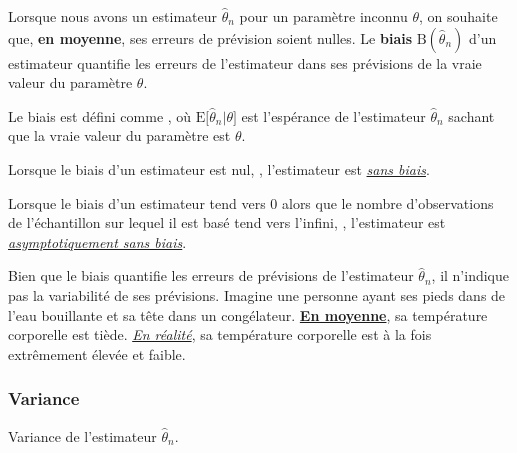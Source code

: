 \documentclass[10pt, french]{article}
\begin{document}
\begin{multicols*}{2}
\begin{rappel_enhanced}[Motivation]
Lorsque nous avons un estimateur $\hat{\theta}_{n}$ pour un paramètre inconnu $\theta$, on souhaite que, \textbf{en moyenne}, ses erreurs de prévision soient nulles. Le \textbf{biais} $\text{B}(\hat{\theta}_{n})$ d'un estimateur quantifie les erreurs de l'estimateur dans ses prévisions de la vraie valeur du paramètre $\theta$.
\end{rappel_enhanced}


\begin{definitionNOHFILL}
Le biais est défini comme , où $\text{E}\lbrack\hat{\theta}_{n} | \theta\rbrack$ est l'espérance de l'estimateur $\hat{\theta}_{n}$ sachant que la vraie valeur du paramètre est $\theta$.

\begin{definitionNOHFILLprop}
Lorsque le biais d'un estimateur est nul, , l'estimateur est \underline{\textit{sans biais}}.
\end{definitionNOHFILLprop}

\begin{definitionNOHFILLprop}
Lorsque le biais d'un estimateur tend vers 0 alors que le nombre d'observations de l'échantillon sur lequel il est basé tend vers l'infini, , l'estimateur est \underline{\textit{asymptotiquement sans biais}}.
\end{definitionNOHFILLprop}
\end{definitionNOHFILL}

\begin{rappel_enhanced}[Limitations]
Bien que le biais quantifie les erreurs de prévisions de l'estimateur $\hat{\theta}_{n}$, il n'indique pas la variabilité de ses prévisions. Imagine une personne ayant ses pieds dans de l'eau bouillante et sa tête dans un congélateur. \textbf{\underline{En moyenne}}, sa température corporelle est tiède. \textit{\underline{En réalité}}, sa température corporelle est à la fois extrêmement élevée et faible. 
\end{rappel_enhanced}



\columnbreak
\subsubsection{Variance}
\begin{distributions}[Notation]
\begin{description}[font = \normalfont]
	\item[$\text{Var}(\hat{\theta}_{n})$]	Variance de l'estimateur $\hat{\theta}_{n}$.
\end{description}
\end{distributions}


\end{multicols*}
\end{document}
